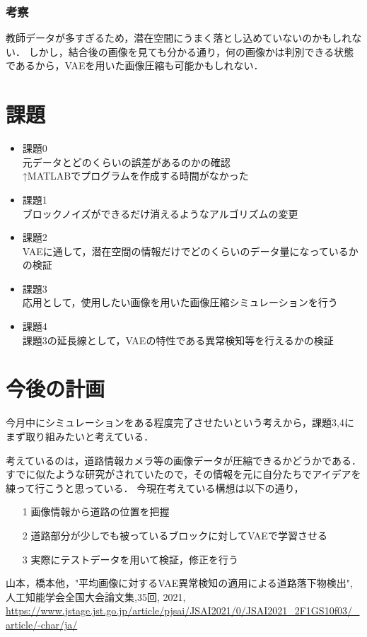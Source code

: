 \documentclass[twocolumn, a4j]{jsarticle}
\begin{document}
\subsubsection{考察}
教師データが多すぎるため，潜在空間にうまく落とし込めていないのかもしれない．
しかし，結合後の画像を見ても分かる通り，何の画像かは判別できる状態であるから，VAEを用いた画像圧縮も可能かもしれない．

\section{課題}
\begin{itemize}
  \item 課題0\\
  元データとどのくらいの誤差があるのかの確認
  \\↑MATLABでプログラムを作成する時間がなかった
  \item 課題1\\
  ブロックノイズができるだけ消えるようなアルゴリズムの変更
  \item 課題2\\
  VAEに通して，潜在空間の情報だけでどのくらいのデータ量になっているかの検証
  \item 課題3\\
  応用として，使用したい画像を用いた画像圧縮シミュレーションを行う
  \item 課題4\\
  課題3の延長線として，VAEの特性である異常検知等を行えるかの検証
\end{itemize}

\section{今後の計画}
今月中にシミュレーションをある程度完了させたいという考えから，課題3,4にまず取り組みたいと考えている．

考えているのは，道路情報カメラ等の画像データが圧縮できるかどうかである．
すでに似たような研究がされていたので，その情報を元に自分たちでアイデアを練って行こうと思っている．
今現在考えている構想は以下の通り，
\begin{itemize}
  \item[1] 画像情報から道路の位置を把握
  \item[2] 道路部分が少しでも被っているブロックに対してVAEで学習させる
  \item[3] 実際にテストデータを用いて検証，修正を行う
\end{itemize}

\begin{thebibliography}{9}
   山本，橋本他，"平均画像に対するVAE異常検知の適用による道路落下物検出", 人工知能学会全国大会論文集,35回, 2021, 
  \url{https://www.jstage.jst.go.jp/article/pjsai/JSAI2021/0/JSAI2021_2F1GS10f03/_article/-char/ja/}
\end{thebibliography}
\end{document}
